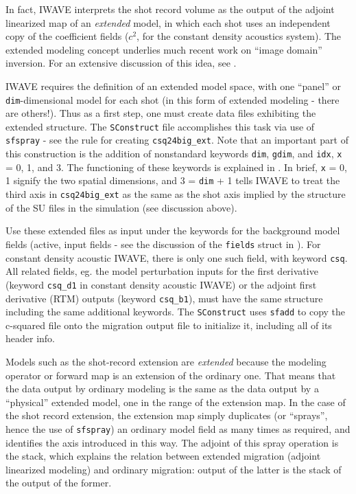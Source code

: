 In fact, IWAVE interprets the shot record volume as the output of the adjoint linearized map of an {\em extended} model, in which each shot uses an independent copy of the coefficient fields ($c^2$, for the constant density acoustics system). The extended modeling concept underlies much recent work on ``image domain'' inversion. For an extensive discussion of this idea, see \cite[]{geoprosp:2008}.

IWAVE requires the definition of an extended model space, with one ``panel'' or {\tt dim}-dimensional model for each shot (in this form of extended modeling - there are others!). Thus as a first step, one must create data files exhibiting the extended structure. The {\tt SConstruct} file accomplishes this task via use of {\tt sfspray} - see the rule for creating {\tt csq24big\_ext}. Note that an important part of this construction is the addition of nonstandard keywords {\tt dim}, {\tt gdim}, and {\tt idx}, {\tt x} = 0, 1, and 3. The functioning of these keywords is explained in  \cite[]{trip14:struct}. In brief, {\tt x} = 0, 1 signify the two spatial dimensions, and 3 = {\tt dim} + 1 tells IWAVE to treat the third axis in {\tt csq24big\_ext} as the same as the shot axis implied by the structure of the SU files in the simulation (see discussion above). 

Use these extended files as input under the keywords for the background model fields (active, input fields - see the discussion of the {\tt fields} struct in \cite[]{trip14:struct}). For constant density acoustic IWAVE, there is only one such field, with keyword {\tt csq}. All related fields, eg. the model perturbation inputs for the first derivative (keyword {\tt csq\_d1} in constant density acoustic IWAVE) or the adjoint first derivative (RTM) outputs (keyword {\tt csq\_b1}), must have the same structure including the same additional keywords. The {\tt SConstruct} uses {\tt sfadd} to copy the c-squared file onto the migration output file to initialize it, including all of its header info.

Models such as the shot-record extension are {\em extended} because the modeling operator or forward map is an extension of the ordinary one. That means that the data output by ordinary modeling is the same as the data output by a ``physical'' extended model, one in the range of the extension map. In the case of the shot record extension, the extension map simply duplicates (or ``sprays'', hence the use of {\tt sfspray}) an ordinary model field as many times as required, and identifies the axis introduced in this way. The adjoint of this spray operation is the stack, which explains the relation between extended migration (adjoint linearized modeling) and ordinary migration: output of the latter is the stack of the output of the former. 

